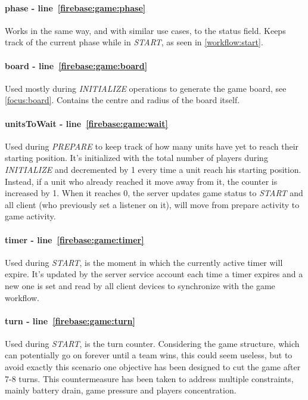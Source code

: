 				\paragraph{phase - line~\ref{firebase:game:phase}}
				Works in the same way, and with similar use cases, to the status field.
				Keeps track of the current phase while in \emph{START}, as seen in \autoref{workflow:start}.
				
				\paragraph{board - line~\ref{firebase:game:board}}
				Used mostly during \emph{INITIALIZE} operations to generate the game board, see \autoref{focus:board}.
				Contains the centre and radius of the board itself.
				
				\paragraph{unitsToWait - line~\ref{firebase:game:wait}}
				Used during \emph{PREPARE} to keep track of how many units have yet to reach their starting position.
				It's initialized with the total number of players during \emph{INITIALIZE} and decremented by 1 every time a unit reach his starting position.
				Instead, if a unit who already reached it move away from it, the counter is increased by 1.
				When it reaches 0, the server updates game status to \emph{START} and all client (who previously set a listener on it), will move from prepare activity to game activity.
				
				\paragraph{timer - line~\ref{firebase:game:timer}}
				Used during \emph{START}, is the moment in which the currently active timer will expire. It's updated by the server service account each time a timer expires and a new one is set and read by all client devices to synchronize with the game workflow.
				
				\paragraph{turn - line~\ref{firebase:game:turn}}
				Used during \emph{START}, is the turn counter. Considering the game structure, which can potentially go on forever until a team wins, this could seem useless, but to avoid exactly this scenario one objective has been designed to cut the game after 7-8 turns.
				This countermeasure has been taken to address multiple constraints, mainly battery drain, game pressure and players concentration.
				
